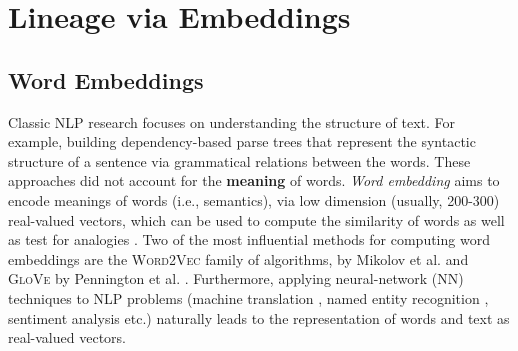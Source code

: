 \chapter{Lineage via Embeddings}
\label{chap:lineage_embeddings}

\section{Word Embeddings}\label{sec:word_embeddings_intro}
Classic NLP research focuses on understanding the structure of text. For example, building dependency-based parse trees \cite{melcuk1988, klein-manning-2004-corpus} that represent the syntactic structure of a sentence via grammatical relations between the words. These approaches did not account for the \textbf{meaning} of words. \textit{Word embedding} aims to encode meanings of words (i.e., semantics), via low dimension (usually, 200-300) real-valued vectors, which can be used to compute the similarity of words as well as test for analogies \cite{DBLP:conf/naacl/MikolovYZ13}. Two of the most influential methods for computing word embeddings are the \textsc{Word2Vec} family of algorithms, by Mikolov et al. \cite{DBLP:journals/corr/abs-1301-3781, DBLP:conf/nips/MikolovSCCD13} and \textsc{GloVe} by Pennington et al. \cite{pennington2014glove}. Furthermore, applying neural-network (NN) techniques to NLP problems (machine translation \cite{wu2016googles}, named entity recognition \cite{Gillick_2016}, sentiment analysis \cite{Maas:2011:LWV:2002472.2002491} etc.) naturally leads to the representation of words and text as real-valued vectors. 

